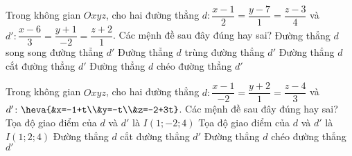 \begin{ex}%
	Trong không gian $Oxyz$, cho hai đường thẳng $d \colon \dfrac{x-1}{2}=\dfrac{y-7}{1}=\dfrac{z-3}{4}$ và  $d' \colon \dfrac{x-6}{3}=\dfrac{y+1}{-2}=\dfrac{z+2}{1}$. Các mệnh đề sau đây đúng hay sai?
	\choiceTF
	{Đường thẳng $d$ song song đường thẳng $d'$}
	{Đường thẳng $d$ trùng đường thẳng $d'$}
	{\True  Đường thẳng $d$ cắt đường thẳng $d'$}
	{Đường thẳng $d$ chéo đường thẳng $d'$}
\end{ex}
\begin{ex}%
	Trong không gian $Oxyz$, cho hai đường thẳng $d \colon \dfrac{x-1}{-2}=\dfrac{y+2}{1}=\dfrac{z-4}{3}$ và  $ d' \colon \heva{&x=-1+t\\&y=-t\\&z=-2+3t}$. Các mệnh đề sau đây đúng hay sai?
	\choiceTF
	{\True  Tọa độ giao điểm của $d$ và $d'$ là $I(1;-2;4)$}
	{Tọa độ giao điểm của $d$ và $d'$ là $I(1;2;4)$}
	{\True  Đường thẳng $d$ cắt đường thẳng $d'$}
	{Đường thẳng $d$ chéo đường thẳng $d'$}
\end{ex}
